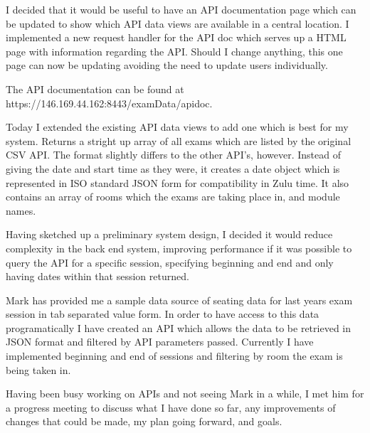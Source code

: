 \documentclass[idxtotoc,hyperref,openany]{labbook} %
\begin{document}

I decided that it would be useful to have an API documentation page which can be updated to show which API data views are available in a central location.  I implemented a new request handler for the API doc which serves up a HTML page with information regarding the API.  Should I change anything, this one page can now be updating avoiding the need to update users individually.

The API documentation can be found at https://146.169.44.162:8443/examData/apidoc.



Today I extended the existing API data views to add one which is best for my system.  Returns a stright up array of all exams which are listed by the original CSV API.  The format slightly differs to the other API's, however.  Instead of giving the date and start time as they were, it creates a date object which is represented in ISO standard JSON form for compatibility in Zulu time.  It also contains an array of rooms which the exams are taking place in, and module names.



Having sketched up a preliminary system design, I decided it would reduce complexity in the back end system, improving performance if it was possible to query the API for a specific session, specifying beginning and end and only having dates within that session returned.



Mark has provided me a sample data source of seating data for last years exam session in tab separated value form.  In order to have access to this data programatically I have created an API which allows the data to be retrieved in JSON format and filtered by API parameters passed.  Currently I have implemented beginning and end of sessions and filtering by room the exam is being taken in.



Having been busy working on APIs and not seeing Mark in a while, I met him for a progress meeting to discuss what I have done so far, any improvements of changes that could be made, my plan going forward, and goals.
\end{document}

